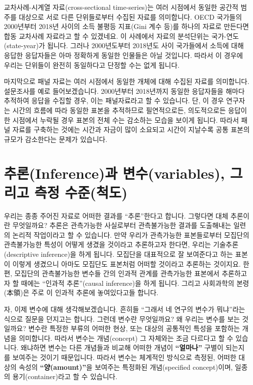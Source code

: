 \documentclass[
]{book}
\begin{document}
교차사례-시계열 자료(cross-sectional time-series)는 여러 시점에서 동일한 공간적 범주를 대상으로 서로 다른 단위들로부터 수집된 자료를 의미합니다. OECD 국가들의 2000년부터 2018년 사이의 소득 불평등 지표(Gini 계수 등)를 하나의 자료로 만든다면 합동 교차사례 자료라고 할 수 있겠네요. 이 사례에서 자료의 분석단위는 국가-연도(state-year)가 됩니다. 그러나 2000년도부터 2018년도 사이 국가들에서 소득에 대해 응답한 응답자들은 아마 정확하게 동일한 인물들은 아닐 것입니다. 따라서 이 경우에 우리는 단위들이 완전히 동일하다고 단정할 수는 없게 됩니다.

마지막으로 패널 자료는 여러 시점에서 동일한 개체에 대해 수집된 자료를 의미합니다. 설문조사를 예로 들어보겠습니다. 2000년부터 2018년까지 동일한 응답자들을 해마다 추적하여 응답을 수집할 경우, 이는 패널자료라고 할 수 있습니다. 단, 이 경우 연구자는 시간의 흐름에 따라 동일한 표본을 추적하므로 필연적으로든, 의도적으로든 응답이 한 시점에서 누락될 경우 표본의 전체 수는 감소하는 모습을 보이게 됩니다. 따라서 패널 자료를 구축하는 것에는 시간과 자금이 많이 소요되고 시간이 지날수록 공통 표본의 규모가 감소한다는 문제가 있습니다.

\hypertarget{uxcd94uxb860inferenceuxacfc-uxbcc0uxc218variables-uxadf8uxb9acuxace0-uxce21uxc815-uxc218uxc900uxcc99uxb3c4}{%
\section{추론(Inference)과 변수(variables), 그리고 측정 수준(척도)}\label{uxcd94uxb860inferenceuxacfc-uxbcc0uxc218variables-uxadf8uxb9acuxace0-uxce21uxc815-uxc218uxc900uxcc99uxb3c4}}

우리는 종종 주어진 자료로 어떠한 결과를 ``추론''한다고 합니다. 그렇다면 대체 추론이란 무엇일까요? 추론은 관측가능한 사실로부터 관측불가능한 결과를 도출해내는 일련의 논리적 작업이라고 할 수 있습니다. 만약 우리가 관측가능한 표본들로부터 모집단의 관측불가능한 특성이 어떻게 생겼을 것이라고 추론하고자 한다면, 우리는 기술추론(descriptive inference)을 하게 됩니다. 모집단을 대표적으로 잘 보여준다고 하는 표본이 이렇게 생겼으니 아마도 모집단도 표본처럼 어떠할 것이라고 추론하는 것이지요. 한편, 모집단의 관측불가능한 변수들 간의 인과적 관계를 관측가능한 표본에서 추론하고자 할 때에는 ``인과적 추론''(causal inference)을 하게 됩니다. 그리고 사회과학의 본령(本領)은 주로 이 인과적 추론에 놓여있다고들 합니다.

자, 이제 변수에 대해 생각해보겠습니다. 흔히들 ``그래서 네 연구의 변수가 뭐냐''라는 식으로 질문을 던지고는 합니다. 그런데 변수란 무엇일까요? 왜 우리는 변수를 보는 것일까요? 변수란 특정한 부류의 어떠한 현상, 또는 대상의 공통적인 특성을 포함하는 개념을 의미합니다. 따라서 변수는 개념(concept) 그 자체와는 조금 다르다고 할 수 있습니다. 왜냐하면 변수는 다른 개념들과 비교해 어떠한 개념이 \textbf{``얼마나''} 구별이 되는지를 보여주는 것이기 때문입니다. 따라서 변수는 체계적인 방식으로 측정된, 어떠한 대상의 속성의 \textbf{``양(amount)''}을 보여주는 특정화된 개념(specified concept)이며, 일종의 용기(container)라고 할 수 있습니다.
\end{document}
